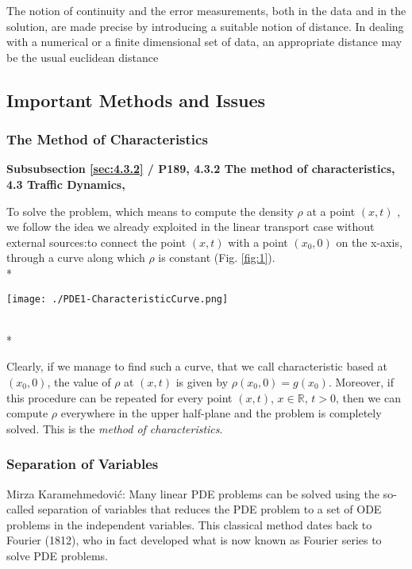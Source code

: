 \documentclass[../main.tex]{subfiles}
\begin{document}
The notion of continuity and the error measurements, both in the data and in the solution, are made precise by introducing a suitable notion of distance. In dealing with a numerical or a finite dimensional set of data, an appropriate distance may be the usual euclidean distance

\subsection{Important Methods and Issues}

\subsubsection{The Method of Characteristics}

\textbf{Subsubsection \ref{sec:4.3.2} / P189, 4.3.2 The method of characteristics, 4.3 Traffic Dynamics, \cite{salsa2016partial}}

To solve the problem, which means to compute the density $\rho$ at a point $(x,t)$ , we follow the idea we already exploited in the linear transport case without external sources:to connect the point $(x,t)$ with a point $(x_0,0)$ on the x-axis, through a curve along which $\rho$ is constant (Fig. \ref{fig:1}).
\\*

\begin{wrapfigure}{\linewidth} \label{fig:1}
\centering
\texttt{[image: ./PDE1-CharacteristicCurve.png]}
    \begin{center}
    \end{center}
\end{wrapfigure}
\\*

Clearly, if we manage to find such a curve, that we call characteristic based at $(x_0,0)$, the value of $\rho$ at $(x,t)$ is given by $\rho (x_0, 0) = g (x_0)$. Moreover, if this procedure can be repeated for every point $(x,t)$, $x \in \mathbb{R}$, $t > 0$, then we can compute $\rho$ everywhere in the upper half-plane and the problem is completely solved. This is the \textit{method of characteristics}.

\subsubsection{Separation of Variables}

\begin{quotebar}
    Mirza Karamehmedović: Many linear PDE problems can be solved using the so-called separation of variables that reduces the PDE problem to a set of ODE problems in the independent variables. This classical method dates back to Fourier (1812), who in fact developed what is now known as Fourier series to solve PDE problems.
\end{quotebar} \\
\end{document}
